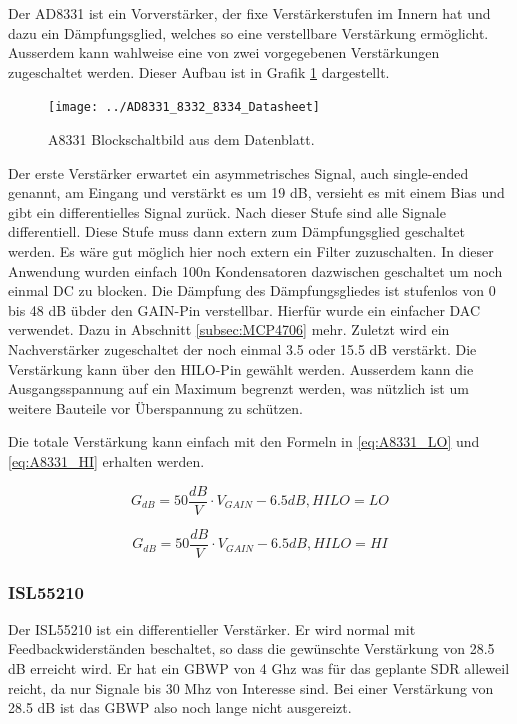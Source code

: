 Der AD8331\cite{AD8331} ist ein Vorverstärker, der fixe Verstärkerstufen im Innern hat und dazu ein Dämpfungsglied, welches so eine verstellbare Verstärkung ermöglicht. Ausserdem kann wahlweise eine von zwei vorgegebenen Verstärkungen zugeschaltet werden. Dieser Aufbau ist in Grafik \ref{fig:AD8331} dargestellt.

\begin{figure}[H]
\begin{center}
    \texttt{[image: ../AD8331\_8332\_8334\_Datasheet]}
    \caption{A8331 Blockschaltbild aus dem Datenblatt\cite{AD8331}.}
    \label{fig:AD8331}
\end{center}
\end{figure}

Der erste Verstärker erwartet ein asymmetrisches Signal, auch single-ended genannt, am Eingang und verstärkt es um 19 dB, versieht es mit einem Bias und gibt ein differentielles Signal zurück. Nach dieser Stufe sind alle Signale differentiell.
Diese Stufe muss dann extern zum Dämpfungsglied geschaltet werden. Es wäre gut möglich hier noch extern ein Filter zuzuschalten. In dieser Anwendung wurden einfach 100n Kondensatoren dazwischen geschaltet um noch einmal DC zu blocken. %
Die Dämpfung des Dämpfungsgliedes ist stufenlos von 0 bis 48 dB übder den GAIN-Pin verstellbar. Hierfür wurde ein einfacher DAC verwendet. Dazu in Abschnitt \ref{subsec:MCP4706} mehr.
Zuletzt wird ein Nachverstärker zugeschaltet der noch einmal 3.5 oder 15.5 dB verstärkt. Die Verstärkung kann über den HILO-Pin gewählt werden.
Ausserdem kann die Ausgangsspannung auf ein Maximum begrenzt werden, was nützlich ist um weitere Bauteile vor Überspannung zu schützen.

Die totale Verstärkung kann einfach mit den Formeln\cite{AD8331} in \ref{eq:A8331_LO} und \ref{eq:A8331_HI} erhalten werden.

\begin{equation}
    G_{dB} = 50 \frac{dB}{V} \cdot V_{GAIN} - 6.5 dB, HILO = LO
\label{eq:A8331_LO}
\end{equation}

\begin{equation}
    G_{dB} = 50 \frac{dB}{V} \cdot V_{GAIN} - 6.5 dB, HILO = HI
\label{eq:A8331_HI}
\end{equation}

\subsubsection{ISL55210}
Der ISL55210\cite{ISL55210} ist ein differentieller Verstärker. Er wird normal mit Feedbackwiderständen beschaltet\cite{ImpedanceMatching2009}, so dass die gewünschte Verstärkung von 28.5 dB erreicht wird.
Er hat ein GBWP von 4 Ghz was für das geplante SDR alleweil reicht, da nur Signale bis 30 Mhz von Interesse sind. Bei einer Verstärkung von 28.5 dB ist das GBWP also noch lange nicht ausgereizt.

